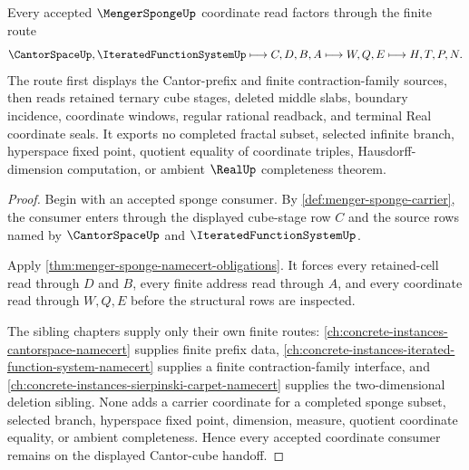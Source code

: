 \begin{theorem}
\label{thm:menger-sponge-cantor-cube-handoff}
Every accepted $\MengerSpongeUp$ coordinate read factors through the finite route
$$
\CantorSpaceUp,\IteratedFunctionSystemUp \longmapsto C,D,B,A \longmapsto W,Q,E \longmapsto H,T,P,N .
$$
The route first displays the Cantor-prefix and finite contraction-family sources, then reads retained ternary cube stages, deleted middle slabs, boundary incidence, coordinate windows, regular rational readback, and terminal Real coordinate seals. It exports no completed fractal subset, selected infinite branch, hyperspace fixed point, quotient equality of coordinate triples, Hausdorff-dimension computation, or ambient $\RealUp$ completeness theorem.
\end{theorem}
\begin{proof}
Begin with an accepted sponge consumer. By \autoref{def:menger-sponge-carrier}, the consumer enters through the displayed cube-stage row $C$ and the source rows named by $\CantorSpaceUp$ and $\IteratedFunctionSystemUp$.

Apply \autoref{thm:menger-sponge-namecert-obligations}. It forces every retained-cell read through $D$ and $B$, every finite address read through $A$, and every coordinate read through $W,Q,E$ before the structural rows are inspected.

The sibling chapters supply only their own finite routes: \autoref{ch:concrete-instances-cantorspace-namecert} supplies finite prefix data, \autoref{ch:concrete-instances-iterated-function-system-namecert} supplies a finite contraction-family interface, and \autoref{ch:concrete-instances-sierpinski-carpet-namecert} supplies the two-dimensional deletion sibling. None adds a carrier coordinate for a completed sponge subset, selected branch, hyperspace fixed point, dimension, measure, quotient coordinate equality, or ambient completeness. Hence every accepted coordinate consumer remains on the displayed Cantor-cube handoff.
\end{proof}



